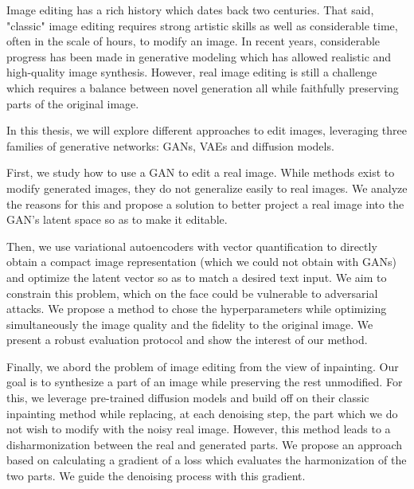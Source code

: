 \documentclass[
    a4paper,
    fontsize=12pt,
    footinclude=true,
    headinclude=true
	]{scrbook}
\begin{document}
Image editing has a rich history which dates back two centuries. That said, "classic" image editing requires strong artistic skills as well as considerable time, often in the scale of hours, to modify an image. In recent years, considerable progress has been made in generative modeling which has allowed realistic and high-quality image synthesis. However, real image editing is still a challenge which requires a balance between novel generation all while faithfully preserving parts of the original image.

In this thesis, we will explore different approaches to edit images, leveraging three families of generative networks: GANs, VAEs and diffusion models.

First, we study how to use a GAN to edit a real image. While methods exist to modify generated images, they do not generalize easily to real images. We analyze the reasons for this and propose a solution to better project a real image into the GAN's latent space so as to make it editable.

Then, we use variational autoencoders with vector quantification to directly obtain a compact image representation (which we could not obtain with GANs) and optimize the latent vector so as to match a desired text input. We aim to constrain this problem, which on the face could be vulnerable to adversarial attacks. We propose a method to chose the hyperparameters while optimizing simultaneously the image quality and the fidelity to the original image. We present a robust evaluation protocol and show the interest of our method.

Finally, we abord the problem of image editing from the view of inpainting. Our goal is to synthesize a part of an image while preserving the rest unmodified. For this, we leverage pre-trained diffusion models and build off on their classic inpainting method while replacing, at each denoising step, the part which we do not wish to modify with the noisy real image. However, this method leads to a disharmonization between the real and generated parts. We propose an approach based on calculating a gradient of a loss which evaluates the harmonization of the two parts. We guide the denoising process with this gradient.
\end{document}
